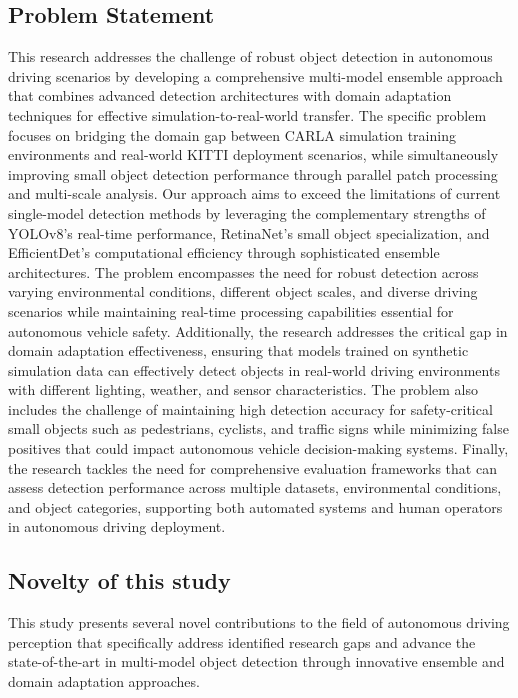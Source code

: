 \documentclass[conference]{IEEEtran}
\begin{document}
\subsection{Problem Statement}
This research addresses the challenge of robust object detection in autonomous driving scenarios by developing a comprehensive multi-model ensemble approach that combines advanced detection architectures with domain adaptation techniques for effective simulation-to-real-world transfer.
The specific problem focuses on bridging the domain gap between CARLA simulation training environments and real-world KITTI deployment scenarios, while simultaneously improving small object detection performance through parallel patch processing and multi-scale analysis.
Our approach aims to exceed the limitations of current single-model detection methods by leveraging the complementary strengths of YOLOv8's real-time performance, RetinaNet's small object specialization, and EfficientDet's computational efficiency through sophisticated ensemble architectures.
The problem encompasses the need for robust detection across varying environmental conditions, different object scales, and diverse driving scenarios while maintaining real-time processing capabilities essential for autonomous vehicle safety.
Additionally, the research addresses the critical gap in domain adaptation effectiveness, ensuring that models trained on synthetic simulation data can effectively detect objects in real-world driving environments with different lighting, weather, and sensor characteristics.
The problem also includes the challenge of maintaining high detection accuracy for safety-critical small objects such as pedestrians, cyclists, and traffic signs while minimizing false positives that could impact autonomous vehicle decision-making systems.
Finally, the research tackles the need for comprehensive evaluation frameworks that can assess detection performance across multiple datasets, environmental conditions, and object categories, supporting both automated systems and human operators in autonomous driving deployment.

\subsection{Novelty of this study}
This study presents several novel contributions to the field of autonomous driving perception that specifically address identified research gaps and advance the state-of-the-art in multi-model object detection through innovative ensemble and domain adaptation approaches.
\end{document}
